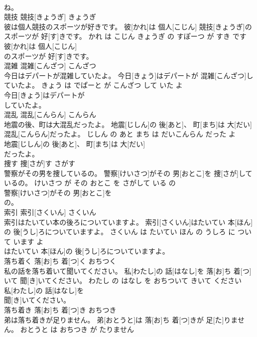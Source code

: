 \documentclass[8pt]{extreport}
\begin{document}
\begin{CJK}{UTF8}{min}
\\	ね。			
\\	競技	競技[きょうぎ]	きょうぎ	
\\	彼は個人競技のスポーツが好きです。	彼[かれ]は 個人[こじん] 競技[きょうぎ]のスポーツが 好[す]きです。	かれ は こじん きょうぎ の すぽーつ が すき です	
\\	彼[かれ]は 個人[こじん]
\\	のスポーツが 好[す]きです。			
\\	混雑	混雑[こんざつ]	こんざつ	
\\	今日はデパートが混雑していたよ。	今日[きょう]はデパートが 混雑[こんざつ]していたよ。	きょう は でぱーと が こんざつ して いた よ	
\\	今日[きょう]はデパートが
\\	していたよ。			
\\	混乱	混乱[こんらん]	こんらん	
\\	地震の後、町は大混乱だったよ。	地震[じしん]の 後[あと]、 町[まち]は 大[だい] 混乱[こんらん]だったよ。	じしん の あと まち は だいこんらん だった よ	
\\	地震[じしん]の 後[あと]、 町[まち]は 大[だい]
\\	だったよ。			
\\	捜す	捜[さが]す	さがす	
\\	警察がその男を捜しているの。	警察[けいさつ]がその 男[おとこ]を 捜[さが]しているの。	けいさつ が その おとこ を さがして いる の	
\\	警察[けいさつ]がその 男[おとこ]を
\\	の。			
\\	索引	索引[さくいん]	さくいん	
\\	索引はたいてい本の後ろについていますよ。	索引[さくいん]はたいてい 本[ほん]の 後[うし]ろについていますよ。	さくいん は たいてい ほん の うしろ に ついて います よ	
\\	はたいてい 本[ほん]の 後[うし]ろについていますよ。			
\\	落ち着く	落[お]ち 着[つ]く	おちつく	
\\	私の話を落ち着いて聞いてください。	私[わたし]の 話[はなし]を 落[お]ち 着[つ]いて 聞[き]いてください。	わたし の はなし を おちついて きいて ください	
\\	私[わたし]の 話[はなし]を
\\	聞[き]いてください。			
\\	落ち着き	落[お]ち 着[つ]き	おちつき	
\\	弟は落ち着きが足りません。	弟[おとうと]は 落[お]ち 着[つ]きが 足[た]りません。	おとうと は おちつき が たりません	

\end{CJK}
\end{document}
